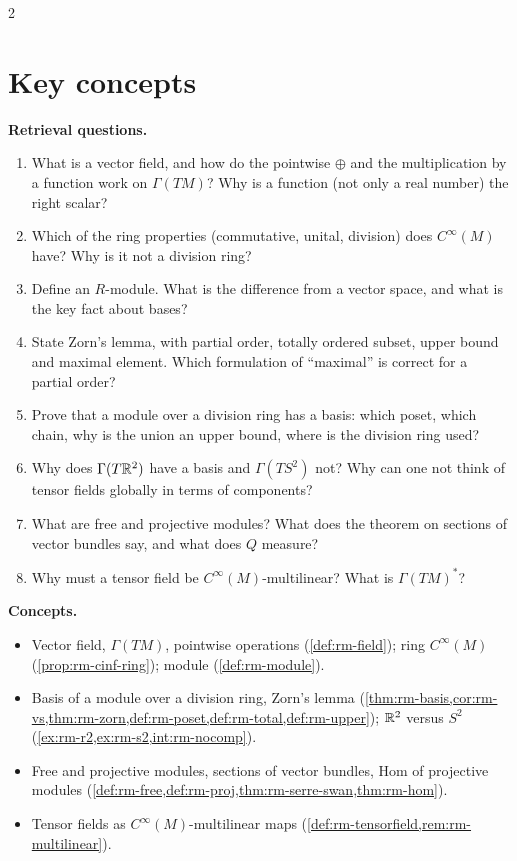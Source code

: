 \begin{paracol}{2}
\section*{Key concepts}
\begin{keyconcepts}
\textbf{Retrieval questions.}
\begin{enumerate}
  \item What is a vector field, and how do the pointwise $\oplus$ and the multiplication by a function work on $\Gamma(TM)$? Why is a function (not only a real number) the right scalar?
  \item Which of the ring properties (commutative, unital, division) does $C^\infty(M)$ have? Why is it not a division ring?
  \item Define an $R$-module. What is the difference from a vector space, and what is the key fact about bases?
  \item State Zorn's lemma, with partial order, totally ordered subset, upper bound and maximal element. Which formulation of ``maximal'' is correct for a partial order?
  \item Prove that a module over a division ring has a basis: which poset, which chain, why is the union an upper bound, where is the division ring used?
  \item Why does $\Gamma(T\mathbb{R}^2)$ have a basis and $\Gamma(TS^2)$ not? Why can one not think of tensor fields globally in terms of components?
  \item What are free and projective modules? What does the theorem on sections of vector bundles say, and what does $Q$ measure?
  \item Why must a tensor field be $C^\infty(M)$-multilinear? What is $\Gamma(TM)^*$?
\end{enumerate}
\textbf{Concepts.}
\begin{itemize}
  \item Vector field, $\Gamma(TM)$, pointwise operations (\cref{def:rm-field}); ring $C^\infty(M)$ (\cref{prop:rm-cinf-ring}); module (\cref{def:rm-module}).
  \item Basis of a module over a division ring, Zorn's lemma (\cref{thm:rm-basis,cor:rm-vs,thm:rm-zorn,def:rm-poset,def:rm-total,def:rm-upper}); $\mathbb{R}^2$ versus $S^2$ (\cref{ex:rm-r2,ex:rm-s2,int:rm-nocomp}).
  \item Free and projective modules, sections of vector bundles, $\mathrm{Hom}$ of projective modules (\cref{def:rm-free,def:rm-proj,thm:rm-serre-swan,thm:rm-hom}).
  \item Tensor fields as $C^\infty(M)$-multilinear maps (\cref{def:rm-tensorfield,rem:rm-multilinear}).
\end{itemize}
\end{keyconcepts}

\flushside
\end{paracol}
